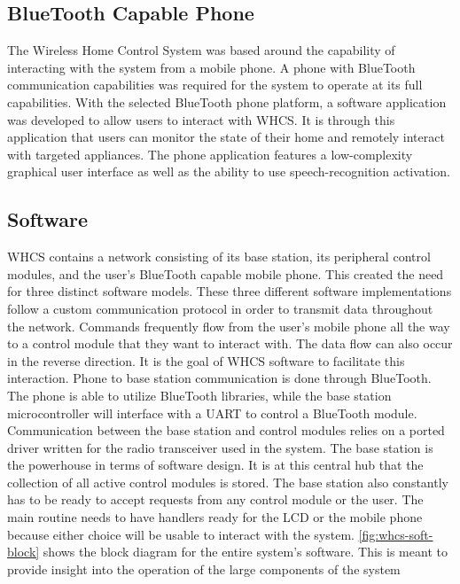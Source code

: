 
\subsection{BlueTooth Capable Phone}
{\color{black} The Wireless Home Control System was based around the capability
of interacting with the system from a mobile phone. A phone with BlueTooth
communication capabilities was required for the system to operate at its full
capabilities. With the selected BlueTooth phone platform, a software
application was developed to allow users to interact with WHCS. It is 
through this application that users can monitor the state of their home and
remotely interact with targeted appliances. The phone application features 
a low{}-complexity graphical user interface as well as the ability to use
speech{}-recognition activation. }

\subsection{Software}
WHCS contains a network consisting of its base station, its peripheral
control modules, and the user{}'s BlueTooth capable mobile phone. This created
the need for three distinct software models. These three different software
implementations follow a custom communication protocol in order to
transmit data throughout the network. Commands frequently flow from the
user{}'s mobile phone all the way to a control module that they want to
interact with.  The data flow can also occur in the reverse direction. It is
the goal of WHCS software to facilitate this interaction.  Phone to base
station communication is done through BlueTooth. The phone is able to
utilize BlueTooth libraries, while the base station microcontroller will
interface with a UART to control a BlueTooth module.  Communication between the
base station and control modules relies on a ported driver written for the
radio transceiver used in the system. The base station is the powerhouse
in terms of software design. It is at this central hub that the collection of
all active control modules is stored. The base station also
constantly has to be ready to accept requests from any control module or the
user. The main routine needs to have handlers ready for the LCD or the
mobile phone because either choice will be usable to interact with the system.
\autoref{fig:whcs-soft-block} shows the block diagram for the entire system{}'s
software. This is meant to provide insight into the operation of the large
components of the system

